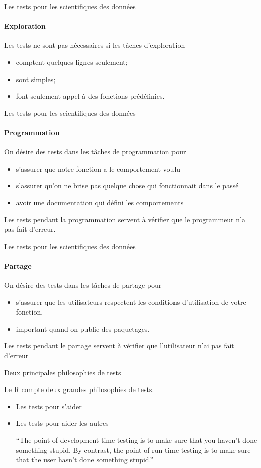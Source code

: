 \documentclass[11pt]{beamer}
\begin{document}
\begin{frame}{Les tests pour les scientifiques des données}
\framesubtitle{Exploration}
Les tests ne sont pas nécessaires si les tâches d'exploration
\begin{itemize}
	\item comptent quelques lignes seulement;
	\item sont simples;
	\item font seulement appel à des fonctions prédéfinies.
\end{itemize}
\end{frame}

\begin{frame}{Les tests pour les scientifiques des données}
\framesubtitle{Programmation}
On désire des tests dans les tâches de programmation pour
\begin{itemize}
\item s'assurer que notre fonction a le comportement voulu
\item s'assurer qu'on ne brise pas quelque chose qui fonctionnait dans le passé
\item avoir une documentation qui défini les comportements
\end{itemize}
Les tests pendant la programmation servent à vérifier que le programmeur n'a pas fait d'erreur.
\end{frame}

\begin{frame}{Les tests pour les scientifiques des données}
\framesubtitle{Partage}
On désire des tests dans les tâches de partage pour
\begin{itemize}
\item s'assurer que les utilisateurs respectent les conditions d'utilisation de votre fonction.
\item important quand on publie des paquetages.
\end{itemize}
Les tests pendant le partage servent à vérifier que l'utilisateur n'ai pas fait d'erreur
\end{frame}

\begin{frame}{Deux principales philosophies de tests}

Le \textsf{R} compte deux grandes philosophies de tests.

\begin{itemize}
\item Les tests pour s'aider
\item Les tests pour aider les autres
\begin{block}{}
{\large ``The point of development-time testing is to make sure that you
haven’t done something stupid. By contrast, the point of run-time
testing is to make sure that the user hasn’t done something stupid.''}
\vskip5mm
\hspace*{}
\end{block}

\end{itemize}
\end{frame}
\end{document}
